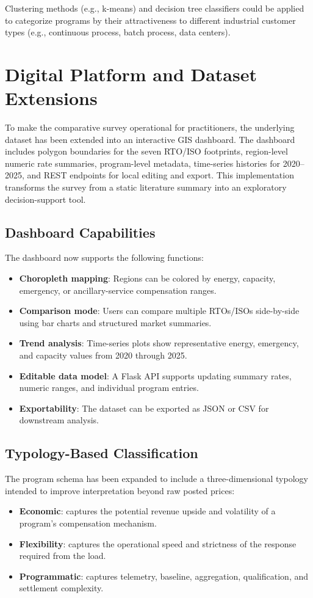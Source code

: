 \documentclass[12pt]{article}
\begin{document}
\noindent Clustering methods (e.g., k-means) and decision tree classifiers could be applied to categorize programs by their attractiveness to different industrial customer types (e.g., continuous process, batch process, data centers).

\section{Digital Platform and Dataset Extensions}

To make the comparative survey operational for practitioners, the underlying dataset has been extended into an interactive GIS dashboard. The dashboard includes polygon boundaries for the seven RTO/ISO footprints, region-level numeric rate summaries, program-level metadata, time-series histories for 2020--2025, and REST endpoints for local editing and export. This implementation transforms the survey from a static literature summary into an exploratory decision-support tool.

\subsection{Dashboard Capabilities}

The dashboard now supports the following functions:
\begin{itemize}
    \item \textbf{Choropleth mapping}: Regions can be colored by energy, capacity, emergency, or ancillary-service compensation ranges.
    \item \textbf{Comparison mode}: Users can compare multiple RTOs/ISOs side-by-side using bar charts and structured market summaries.
    \item \textbf{Trend analysis}: Time-series plots show representative energy, emergency, and capacity values from 2020 through 2025.
    \item \textbf{Editable data model}: A Flask API supports updating summary rates, numeric ranges, and individual program entries.
    \item \textbf{Exportability}: The dataset can be exported as JSON or CSV for downstream analysis.
\end{itemize}

\subsection{Typology-Based Classification}

The program schema has been expanded to include a three-dimensional typology intended to improve interpretation beyond raw posted prices:
\begin{itemize}
    \item \textbf{Economic}: captures the potential revenue upside and volatility of a program's compensation mechanism.
    \item \textbf{Flexibility}: captures the operational speed and strictness of the response required from the load.
    \item \textbf{Programmatic}: captures telemetry, baseline, aggregation, qualification, and settlement complexity.
\end{itemize}
\end{document}
